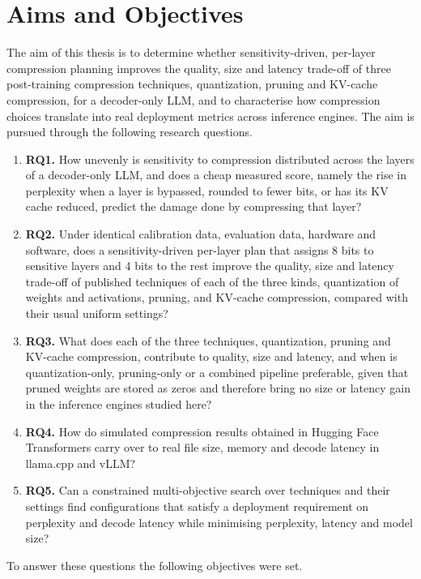\documentclass[
11pt, %
english, %
singlespacing, %
headsepline, %
]{MastersDoctoralThesis} %
\begin{document}
\section{Aims and Objectives}
\label{sec:ch1-aims}

The aim of this thesis is to determine whether sensitivity-driven, per-layer compression planning improves the quality, size and latency trade-off of three post-training compression techniques, quantization, pruning and KV-cache compression, for a decoder-only LLM, and to characterise how compression choices translate into real deployment metrics across inference engines. The aim is pursued through the following research questions.

\begin{enumerate}
  \item \textbf{RQ1.} How unevenly is sensitivity to compression distributed across the layers of a decoder-only LLM, and does a cheap measured score, namely the rise in perplexity when a layer is bypassed, rounded to fewer bits, or has its KV cache reduced, predict the damage done by compressing that layer?
  \item \textbf{RQ2.} Under identical calibration data, evaluation data, hardware and software, does a sensitivity-driven per-layer plan that assigns 8 bits to sensitive layers and 4 bits to the rest improve the quality, size and latency trade-off of published techniques of each of the three kinds, quantization of weights and activations, pruning, and KV-cache compression, compared with their usual uniform settings?
  \item \textbf{RQ3.} What does each of the three techniques, quantization, pruning and KV-cache compression, contribute to quality, size and latency, and when is quantization-only, pruning-only or a combined pipeline preferable, given that pruned weights are stored as zeros and therefore bring no size or latency gain in the inference engines studied here?
  \item \textbf{RQ4.} How do simulated compression results obtained in Hugging Face Transformers carry over to real file size, memory and decode latency in llama.cpp and vLLM?
  \item \textbf{RQ5.} Can a constrained multi-objective search over techniques and their settings find configurations that satisfy a deployment requirement on perplexity and decode latency while minimising perplexity, latency and model size?
\end{enumerate}

To answer these questions the following objectives were set.
\end{document}
